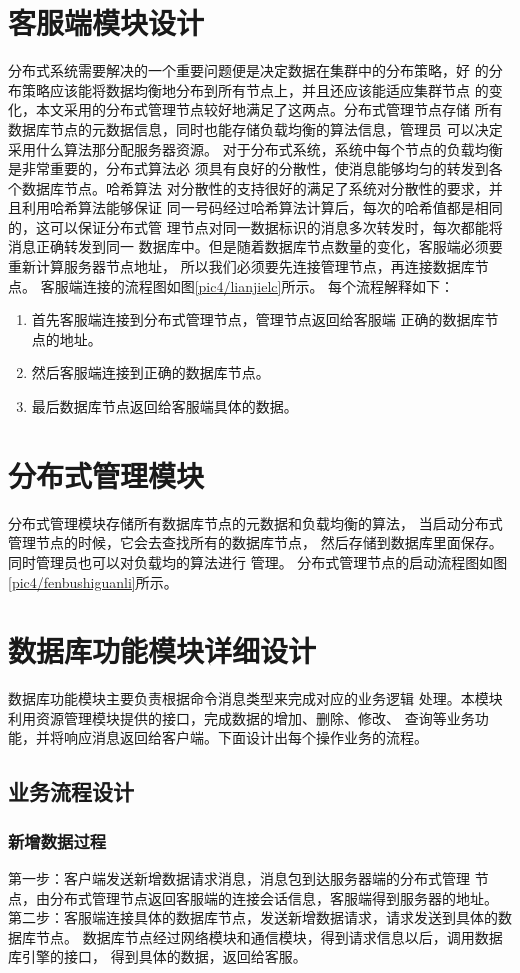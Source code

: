 \section{客服端模块设计}
分布式系统需要解决的一个重要问题便是决定数据在集群中的分布策略，好
的分布策略应该能将数据均衡地分布到所有节点上，并且还应该能适应集群节点
的变化，本文采用的分布式管理节点较好地满足了这两点。分布式管理节点存储
所有数据库节点的元数据信息，同时也能存储负载均衡的算法信息，管理员
可以决定采用什么算法那分配服务器资源。
对于分布式系统，系统中每个节点的负载均衡是非常重要的，分布式算法必
须具有良好的分散性，使消息能够均匀的转发到各个数据库节点。哈希算法
对分散性的支持很好的满足了系统对分散性的要求，并且利用哈希算法能够保证
同一号码经过哈希算法计算后，每次的哈希值都是相同的，这可以保证分布式管
理节点对同一数据标识的消息多次转发时，每次都能将消息正确转发到同一
数据库中。但是随着数据库节点数量的变化，客服端必须要重新计算服务器节点地址，
所以我们必须要先连接管理节点，再连接数据库节点。
客服端连接的流程图如图\ref{pic4/lianjielc}所示。
每个流程解释如下：
\begin{enumerate}
	\item 首先客服端连接到分布式管理节点，管理节点返回给客服端
	正确的数据库节点的地址。
	\item 然后客服端连接到正确的数据库节点。
	\item 最后数据库节点返回给客服端具体的数据。
\end{enumerate}
\section{分布式管理模块}
分布式管理模块存储所有数据库节点的元数据和负载均衡的算法，
当启动分布式管理节点的时候，它会去查找所有的数据库节点，
然后存储到数据库里面保存。同时管理员也可以对负载均的算法进行
管理。
分布式管理节点的启动流程图如图\ref{pic4/fenbushiguanli}所示。
\section{数据库功能模块详细设计}
数据库功能模块主要负责根据命令消息类型来完成对应的业务逻辑
处理。本模块利用资源管理模块提供的接口，完成数据的增加、删除、修改、
查询等业务功能，并将响应消息返回给客户端。下面设计出每个操作业务的流程。
\subsection{业务流程设计}
\subsubsection{新增数据过程}
第一步：客户端发送新增数据请求消息，消息包到达服务器端的分布式管理
节点，由分布式管理节点返回客服端的连接会话信息，客服端得到服务器的地址。
第二步：客服端连接具体的数据库节点，发送新增数据请求，请求发送到具体的数据库节点。
数据库节点经过网络模块和通信模块，得到请求信息以后，调用数据库引擎的接口，
得到具体的数据，返回给客服。

